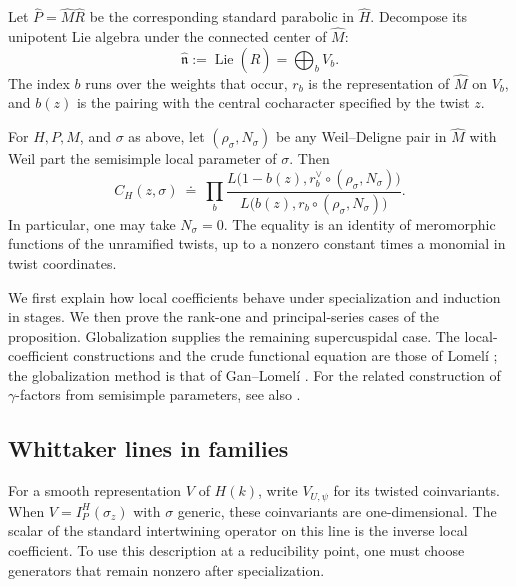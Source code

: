 Let $\widehat P=\widehat M\widehat R$ be the corresponding standard
parabolic in $\widehat H$.  Decompose its unipotent Lie algebra under the
connected center of $\widehat M$:
\begin{equation}
 \widehat{\mathfrak n}
       :=\operatorname{Lie}(\widehat R)=\bigoplus_b V_b.
 \label{eq:central-weight-decomposition}
\end{equation}
The index $b$ runs over the weights that occur, $r_b$ is the representation
of $\widehat M$ on $V_b$, and $b(z)$ is the pairing with the central
cocharacter specified by the twist $z$.

\begin{proposition}
\label{prop:comparison}
For $H,P,M$, and $\sigma$ as above, let
$(\rho_\sigma,N_\sigma)$ be any Weil--Deligne pair in $\widehat M$ with
Weil part the semisimple local parameter of $\sigma$.  Then
\begin{equation}
 C_H(z,\sigma)\ \doteq\
 \prod_b
 \frac{L\bigl(1-b(z),r_b^\vee\circ(\rho_\sigma,N_\sigma)\bigr)}
      {L\bigl(b(z),r_b\circ(\rho_\sigma,N_\sigma)\bigr)}.
 \label{eq:coefficient-comparison}
\end{equation}
In particular, one may take $N_\sigma=0$.  The equality is an identity of
meromorphic functions of the unramified twists, up to a nonzero constant
times a monomial in twist coordinates.
\end{proposition}

We first explain how local coefficients behave under specialization and
induction in stages.  We then prove the rank-one and principal-series
cases of the proposition.  Globalization supplies the remaining
supercuspidal case.  The local-coefficient constructions and the crude
functional equation are those of Lomel\'i
\cite[\S\S1--2 and Theorem~4.3]{LomeliLS}; the globalization method is
that of Gan--Lomel\'i \cite[Theorem~1.1 and \S5]{GanLomeli}.
For the related construction of $\gamma$-factors from semisimple
parameters, see also \cite[Section~7]{GenestierLafforgue}.

\subsection{Whittaker lines in families}

For a smooth representation $V$ of $H(k)$, write $V_{U,\psi}$ for its
twisted coinvariants.  When $V=I_P^H(\sigma_z)$ with $\sigma$ generic,
these coinvariants are one-dimensional.  The scalar of the standard
intertwining operator on this line is the inverse local coefficient.
To use this description at a reducibility point, one must choose
generators that remain nonzero after specialization.


